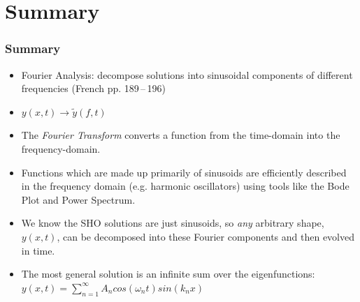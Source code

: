 \documentclass[pdf, handout, hideothersubsections]{beamer}
\begin{document}
\section{Summary}
\begin{frame}
\frametitle{Summary}
\pause
\begin{itemize}
\item Fourier Analysis: decompose solutions into sinusoidal components
  of different frequencies
  (French pp. 189\,--\,196)

\item $y(x, t) \rightarrow \tilde{y}(f, t)$

\item The \emph{Fourier Transform} converts a function from the
  time-domain into the frequency-domain.

\item Functions which are made up primarily of sinusoids are
  efficiently described in the frequency domain (e.g. harmonic
  oscillators) using tools like the Bode Plot and Power Spectrum.

\item We know the SHO solutions are just sinusoids, so \emph{any}
  arbitrary shape, $y(x,t)$, can be decomposed into these Fourier
  components and then evolved in time.

\item The most general solution is an infinite sum over the
  eigenfunctions: \\
  $y(x, t) = \sum_{n=1}^{\infty} A_n cos(\omega_n t) sin(k_n x)$

\end{itemize}


\end{frame}
\end{document}
